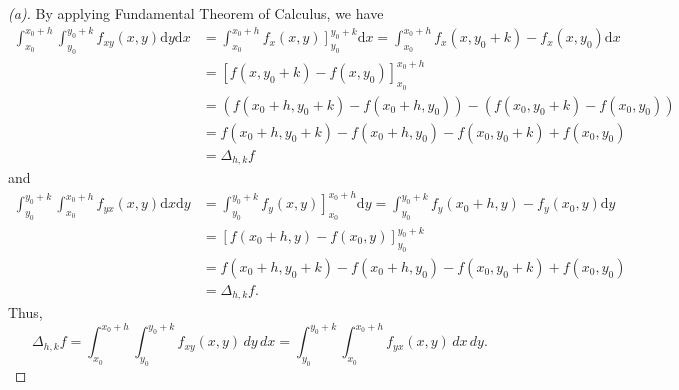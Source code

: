 \begin{proof}[(a)]
    By applying Fundamental Theorem of Calculus, we have 
    \begin{align*}
        \int _{x_0}^{x_0 + h} \int _{y_0}^{y_0 + k} f_{xy}(x, y) \mathrm{d} y \mathrm{d} x &= \int _{x_0}^{x_0 + h} \left. f_x(x, y) \right]_{y_0}^{y_0 + k} \mathrm{d} x = \int _{x_0}^{x_0 + h} f_x (x, y_0 + k) - f_x(x, y_0) \mathrm{d} x \\
        &= \left[ f(x, y_0 + k) - f(x, y_0) \right]_{x_0}^{x_0 + h} \\
        &= \left( f(x_0 + h, y_0 + k) - f(x_0 + h, y_0) \right) - \left( f(x_0, y_0 + k) - f(x_0, y_0) \right) \\
        &= f(x_0 + h, y_0 + k) - f(x_0 + h, y_0) - f(x_0, y_0 + k) + f(x_0, y_0) \\
        &= \Delta _{h, k} f      
    \end{align*}    
    and 
    \begin{align*}
        \int _{y_0}^{y_0 + k} \int _{x_0}^{x_0 + h} f_{yx}(x, y) \mathrm{d} x \mathrm{d} y &= \int _{y_0}^{y_0 + k} \left. f_y(x, y) \right]_{x_0}^{x_0 + h} \mathrm{d} y = \int _{y_0}^{y_0 + k} f_y (x_0 + h, y) - f_y(x_0, y) \mathrm{d} y \\
        &= \left[ f(x_0 + h, y) - f(x_0, y) \right]_{y_0}^{y_0 + k} \\
        &= f(x_0 + h, y_0 + k) - f(x_0 + h, y_0) - f(x_0, y_0 + k) + f(x_0, y_0) \\
        &= \Delta _{h, k} f.      
    \end{align*}
    Thus,
    \[
        \Delta_{h,k} f
=
\int_{x_0}^{x_0+h}\int_{y_0}^{y_0+k} f_{xy}(x,y)\,dy\,dx
=
\int_{y_0}^{y_0+k}\int_{x_0}^{x_0+h} f_{yx}(x,y)\,dx\,dy.
    \]
\end{proof}

